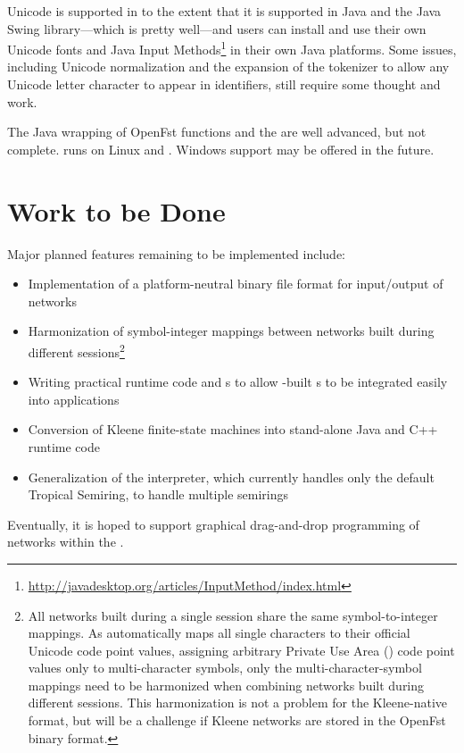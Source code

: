 \noindent
Unicode is supported in \Kleene{} to the extent that it is supported in
Java and the Java Swing library---which is pretty well---and users can
install and use their own Unicode fonts and Java Input
Methods\footnote{\url{http://javadesktop.org/articles/InputMethod/index.html}}
in their own Java platforms.  Some issues, including Unicode
normalization and the expansion of the \Kleene{} tokenizer to allow any
Unicode letter character to appear in identifiers, still require some
thought and work.

The Java wrapping of OpenFst functions and the  are well
advanced, but not complete.  \Kleene{} runs on Linux and .
Windows support may be offered in the future.

\section{Work to be Done}

Major planned features remaining to be implemented include:

\begin{itemize}
\item
Implementation of a platform-neutral binary file format for
input/output of networks
\item
Harmonization of symbol-integer mappings between networks built
during different \Kleene{} sessions\footnote{All
networks built during a single \Kleene{} session share the same symbol-to-integer mappings.  As
\Kleene{} automatically maps all single characters to their official Unicode code point values,
assigning arbitrary Private Use Area () code point values only to multi-character symbols, only the
multi-character-symbol mappings need to be harmonized when combining networks built
during different sessions.  This harmonization is not a problem for the Kleene-native 
format, but will be a challenge if Kleene networks are stored in the OpenFst binary format.}
\item
Writing practical runtime code and s to allow \Kleene{}-built \fst{}s to be integrated easily into
applications
\item
Conversion of Kleene finite-state machines into stand-alone Java and C++ runtime code
\item
Generalization of the interpreter, which currently handles only the default
Tropical Semiring, to handle multiple semirings
\end{itemize}

\noindent
Eventually, it is hoped to support graphical
drag-and-drop programming of networks within the .


